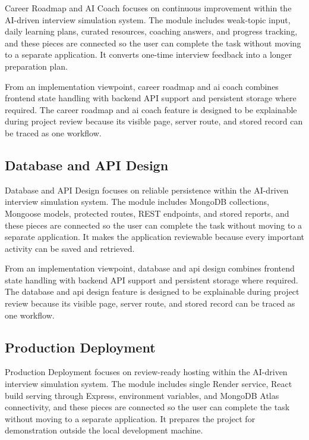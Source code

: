 \documentclass[12pt,a4paper]{report}
\begin{document}
Career Roadmap and AI Coach focuses on continuous improvement within the AI-driven interview simulation system. The module includes weak-topic input, daily learning plans, curated resources, coaching answers, and progress tracking, and these pieces are connected so the user can complete the task without moving to a separate application. It converts one-time interview feedback into a longer preparation plan.

From an implementation viewpoint, career roadmap and ai coach combines frontend state handling with backend API support and persistent storage where required. The career roadmap and ai coach feature is designed to be explainable during project review because its visible page, server route, and stored record can be traced as one workflow.

\subsection{Database and API Design}

Database and API Design focuses on reliable persistence within the AI-driven interview simulation system. The module includes MongoDB collections, Mongoose models, protected routes, REST endpoints, and stored reports, and these pieces are connected so the user can complete the task without moving to a separate application. It makes the application reviewable because every important activity can be saved and retrieved.

From an implementation viewpoint, database and api design combines frontend state handling with backend API support and persistent storage where required. The database and api design feature is designed to be explainable during project review because its visible page, server route, and stored record can be traced as one workflow.

\subsection{Production Deployment}

Production Deployment focuses on review-ready hosting within the AI-driven interview simulation system. The module includes single Render service, React build serving through Express, environment variables, and MongoDB Atlas connectivity, and these pieces are connected so the user can complete the task without moving to a separate application. It prepares the project for demonstration outside the local development machine.
\end{document}
